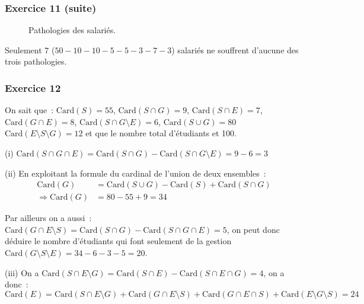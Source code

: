\documentclass[10pt,notheorems]{beamer}
\theoremstyle{plain}
\theoremstyle{definition} %
\begin{document}
\begin{frame}
  \frametitle{Exercice 11 (suite)}
  \fontsize{8}{10}\selectfont

  \begin{figure}[H]
    \centering
    \begin{venndiagram3sets}[tikzoptions={scale=1}, labelA=$\mathcal O$, labelB=$\mathcal H$, labelC=$\mathcal C$,
      labelABC={5},
      labelOnlyA={10},   %
      labelOnlyAC={5},   %
      labelOnlyAB={10},  %
      labelOnlyB={3},    %
      labelOnlyBC={7},   %
      labelOnlyC={3},    %
      labelNotABC={7}]   %
       \end{venndiagram3sets}
       \caption{Pathologies des salariés.}
       \label{fig:11}
  \end{figure}

  \bigskip

  Seulement $7$ ($50-10-10-5-5-3-7-3$) salariés ne souffrent d'aucune des trois pathologies.
\end{frame}


\begin{frame}
  \frametitle{Exercice 12}
  \fontsize{8}{10}\selectfont

  On sait que~: $\mathrm{Card}(S)=55$, $\mathrm{Card}(S\cap G)=9$, $\mathrm{Card}(S\cap E)=7$, $\mathrm{Card}(G\cap E)=8$, $\mathrm{Card}(S\cap G\setminus E)=6$, $\mathrm{Card}(S\cup G)=80$ $\mathrm{Card}(E\setminus S\setminus G)=12$ et que le nombre total d'étudiants et 100.\newline

 (i) $\mathrm{Card}(S \cap G \cap E) = \mathrm{Card}(S \cap G) - \mathrm{Card}(S \cap G \setminus E) = 9 - 6 = 3$\newline

 (ii) En exploitant la formule du cardinal de l'union de deux ensembles~:
 \[
   \begin{split}
     \mathrm{Card}(G) &= \mathrm{Card}(S \cup G) - \mathrm{Card}(S) + \mathrm{Card}(S \cap G)\\
     \Rightarrow  \mathrm{Card}(G) &= 80 - 55 +9 = 34
   \end{split}
 \]

 Par ailleurs on a aussi~: $\mathrm{Card}(G \cap E \setminus S) = \mathrm{Card}(S \cap G) - \mathrm{Card}(S \cap G \cap E) = 5$, on peut donc déduire le nombre d'étudiants qui font seulement de la gestion $\mathrm{Card}(G \setminus S \setminus E) = 34 - 6 - 3 - 5 = 20$.\newline

 (iii) On a $\mathrm{Card}(S \cap E \setminus G) = \mathrm{Card}(S \cap E) - \mathrm{Card}(S \cap E \cap G) = 4$, on a donc~:
 \[
   \mathrm{Card}(E) = \mathrm{Card}(S \cap E \setminus G) + \mathrm{Card}(G \cap E \setminus S) + \mathrm{Card}(G \cap E \cap S) +
   \mathrm{Card}(E \setminus G \setminus S) = 24
 \]

\end{frame}
\end{document}
